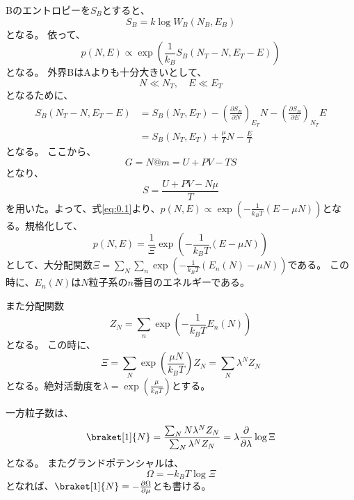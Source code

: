 \documentclass[titlepage]{ltjsarticle}
\newcommand{\ev}[1]{\braket[1]{#1}}
\begin{document}
Bのエントロピーを\(S_B\)とすると、
\begin{equation}
  S_B = k\log W_B(N_B,E_B)
\end{equation}
となる。
依って、
\begin{equation}\label{eq:0.1}
  p(N,E) \propto \exp\left( \frac{1}{k_B}S_B(N_T-N,E_T-E) \right)
\end{equation}
となる。
外界BはAよりも十分大きいとして、
\begin{equation}
  N \ll N_T  ,\quad E \ll E_T
\end{equation}
となるために、
\begin{align}
  S_B (N_T-N,E_T-E) &= S_B(N_T,E_T) - \left( \frac{\partial S_B}{\partial N} \right)_{E_T}N - \left( \frac{\partial S_B}{\partial E} \right)_{N_T}E \\
  &  = S_B(N_T,E_T)  + \frac{\mu}{T} N - \frac{E}{T}
\end{align}
となる。
ここから、
\begin{equation}
  G = N@m  = U + PV - TS
\end{equation}
となり、
\begin{equation}
  S = \frac{U+PV-N \mu}{T}
\end{equation}
を用いた。よって、式\eqref{eq:0.1}より、\(p(N,E)\propto \exp\left( -\frac{1}{k_BT}(E-\mu N) \right)\)となる。規格化して、
\begin{equation}
  p(N,E) = \frac{1}{\Xi} \exp\left( -\frac{1}{k_BT}(E-\mu N) \right)
\end{equation}
として、大分配関数\(\Xi = \sum_N \sum_n \exp \left( -\frac{1}{k_BT} \left( E_n(N)-\mu N \right) \right)\)である。
この時に、\(E_n(N)\)は\(N\)粒子系の\(n\)番目のエネルギーである。

また分配関数
\begin{equation}
  Z_N = \sum_n \exp \left( -\frac{1}{k_BT}E_n(N) \right)
\end{equation}
となる。
この時に、
\begin{equation}
  \Xi = \sum_N \exp \left( \frac{\mu N}{k_BT} \right)Z_N = \sum_N \lambda^N Z_N
\end{equation}
となる。絶対活動度を\(\lambda = \exp \left( \frac{\mu}{k_BT} \right)\)とする。

一方粒子数は、
\begin{equation}
  \ev{N} = \frac{\sum_N N \lambda^N Z_N}{\sum_N \lambda^N Z_N} = \lambda \pdv{}{\lambda} \log \Xi
\end{equation}
となる。
またグランドポテンシャルは、
\begin{equation}
  \Omega = -k_BT \log \Xi
\end{equation}
となれば、\(\ev{N} = - \pdv{\Omega}{\mu}\)とも書ける。
\end{document}
